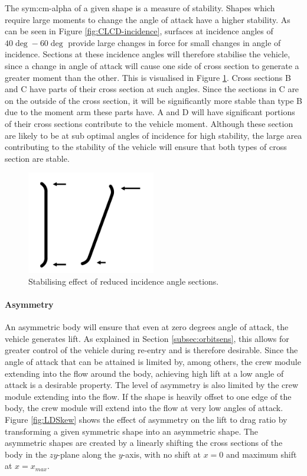 The \gls{sym:cm-alpha} of a given shape is a measure of stability. Shapes which require large moments to change the angle of attack have a higher stability. As can be seen in Figure \ref{fig:CLCD-incidence}, surfaces at incidence angles of $40\deg-60\deg$ provide large changes in force for small changes in angle of incidence. Sections at these incidence angles will therefore stabilise the vehicle, since a change in angle of attack will cause one side of cross section to generate a greater moment than the other. This is visualised in Figure \ref{fig:StabMom}. Cross sections B and C have parts of their cross section at such angles. Since the sections in C are on the outside of the cross section, it will be significantly more stable than type B due to the moment arm these parts have. A and D will have significant portions of their cross sections contribute to the vehicle moment. Although these section are likely to be at sub optimal angles of incidence for high stability, the large area contributing to the stability of the vehicle will ensure that both types of cross section are stable. 

\begin{figure}[h]
	\centering
	\includegraphics[width=0.5\textwidth]{./Figure/Aerodynamics/StabilizeMoment.pdf}
	\caption{Stabilising effect of reduced incidence angle sections. }
	\label{fig:StabMom}
\end{figure}

\paragraph{Asymmetry}
An asymmetric body will ensure that even at zero degrees angle of attack, the vehicle generates lift. As explained in Section \ref{subsec:orbitsens}, this allows for greater control of the vehicle during re-entry and is therefore desirable. Since the angle of attack that can be attained is limited by, among others, the crew module extending into the flow around the body, achieving high lift at a low angle of attack is a desirable property. The level of asymmetry is also limited by the crew module extending into the flow. If the shape is heavily offset to one edge of the body, the crew module will extend into the flow at very low angles of attack. Figure \ref{fig:LDSkew} shows the effect of asymmetry on the lift to drag ratio by transforming a given symmetric shape into an asymmetric shape. The asymmetric shapes are created by a linearly shifting the cross sections of the body in the $zy$-plane along the $y$-axis, with no shift at $x=0$ and maximum shift at $x=x_{max}$. 

